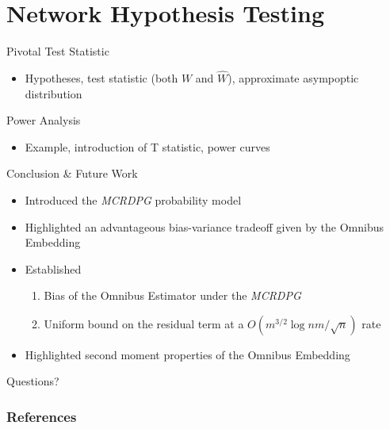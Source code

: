 \documentclass[handout]{beamer}
\begin{document}
\section{Network Hypothesis Testing}


\begin{frame}{Pivotal Test Statistic}
    \begin{itemize}
        \item Hypotheses, test statistic (both $W$ and $\hat{W}$), approximate asympoptic distribution 
    \end{itemize}
\end{frame}

\begin{frame}{Power Analysis}
    \begin{itemize}
        \item Example, introduction of T statistic, power curves
    \end{itemize}
\end{frame}



\begin{frame}{Conclusion \& Future Work}
    \begin{itemize}
        \item Introduced the \textit{MCRDPG} probability model
        \item Highlighted an advantageous bias-variance tradeoff given by the Omnibus Embedding
        \item Established
        \begin{enumerate}
            \item Bias of the Omnibus Estimator under the \textit{MCRDPG}
            \item Uniform bound on the residual term at a $O(m^{3/2}\log nm/\sqrt{n})$ rate 
        \end{enumerate}
        \item  Highlighted second moment properties of the Omnibus Embedding
    \end{itemize}
    
\end{frame}

\begin{frame}{}
    \begin{center}
        {\Large Questions?}
    \end{center}
\end{frame}

\nocite{*}
\begin{frame}[t,allowframebreaks]
  \frametitle{References}
  \printbibliography
 \end{frame}
\end{document}
